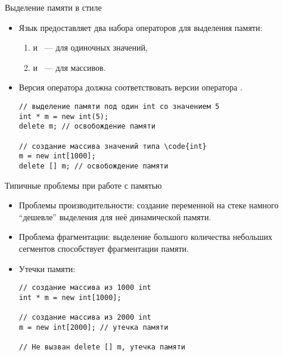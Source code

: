 \documentclass{beamer}
\begin{document}
\begin{frame}[fragile]{Выделение памяти в стиле \langcpp}
    \begin{itemize}
        \item Язык \langcpp предоставляет два набора операторов для
            выделения памяти:
            \begin{enumerate}
                \item {} и ~--- для одиночных значений,

                \item {} и ~--- для массивов.
            \end{enumerate}

        \item Версия оператора  должна соответствовать
            версии оператора .
\begin{lstlisting}
// выделение памяти под один int со значением 5
int * m = new int(5);
delete m; // освобождение памяти

// создание массива значений типа \code{int}
m = new int[1000];
delete [] m; // освобождение памяти
\end{lstlisting}
    \end{itemize}
\end{frame}

\begin{frame}[fragile]{Типичные проблемы при работе с памятью}
    \begin{itemize}
        \item Проблемы производительности: создание переменной на стеке
            намного ``дешевле'' выделения для неё динамической памяти.

        \item Проблема фрагментации: выделение большого количества
            небольших сегментов способствует фрагментации памяти.
        
        \item Утечки памяти:
\begin{lstlisting}
// создание массива из 1000 int    
int * m = new int[1000];

// создание массива из 2000 int    
m = new int[2000]; // утечка памяти

// Не вызван delete [] m, утечка памяти
\end{lstlisting}
    \end{itemize}
\end{frame}
\end{document}

